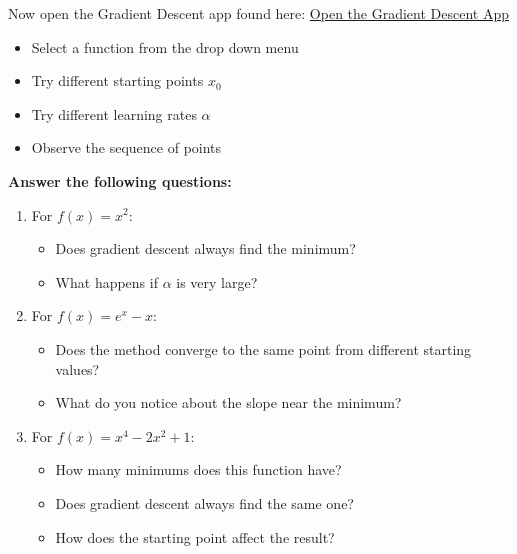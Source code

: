 \documentclass[11pt]{article}
\begin{document}
Now open the Gradient Descent app found here: \href{https://woodword0-gradientdescentapplication.hf.space/}{Open the Gradient Descent App}


\begin{itemize}
    \item Select a function from the drop down menu
    \item Try different starting points $x_0$
    \item Try different learning rates $\alpha$
    \item Observe the sequence of points
\end{itemize}

\textbf{Answer the following questions:}

\begin{enumerate}

    \item For $f(x) = x^2$:
    \begin{itemize}
        \item Does gradient descent always find the minimum?
         \vspace{2cm}
        
        \item What happens if $\alpha$ is very large?
    \end{itemize}
    \vspace{2cm}

    \item For $f(x) = e^x - x$:
    \begin{itemize}
        \item Does the method converge to the same point from different starting values?
        \vspace{2cm}
        
        \item What do you notice about the slope near the minimum?
    \end{itemize}
    \vspace{2cm}

    \item For $f(x) = x^4 - 2x^2 + 1$:
    \begin{itemize}
        \item How many minimums does this function have?
         \vspace{2cm}
        
        \item Does gradient descent always find the same one?
         \vspace{2cm}
        
        \item How does the starting point affect the result?
    \end{itemize}

\end{enumerate}
\end{document}
